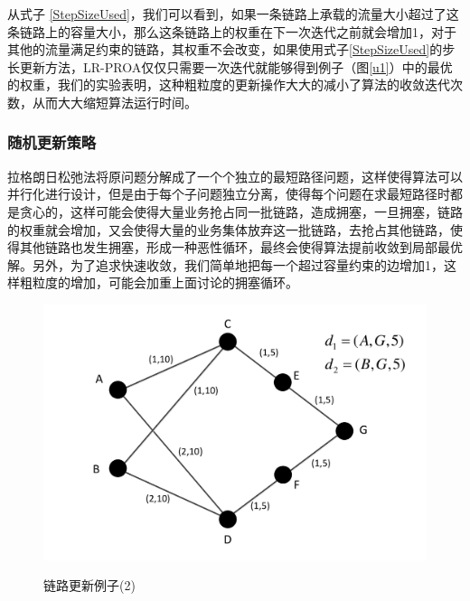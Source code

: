 从式子 \ref{StepSizeUsed}，我们可以看到，如果一条链路上承载的流量大小超过了这条链路上的容量大小，那么这条链路上的权重在下一次迭代之前就会增加1，对于其他的流量满足约束的链路，其权重不会改变，如果使用式子\ref{StepSizeUsed}的步长更新方法，LR-PROA仅仅只需要一次迭代就能够得到例子（图\ref{u1}）中的最优的权重，我们的实验表明，这种粗粒度的更新操作大大的减小了算法的收敛迭代次数，从而大大缩短算法运行时间。
\subsubsection{随机更新策略}

拉格朗日松弛法将原问题分解成了一个个独立的最短路径问题，这样使得算法可以并行化进行设计，但是由于每个子问题独立分离，使得每个问题在求最短路径时都是贪心的，这样可能会使得大量业务抢占同一批链路，造成拥塞，一旦拥塞，链路的权重就会增加，又会使得大量的业务集体放弃这一批链路，去抢占其他链路，使得其他链路也发生拥塞，形成一种恶性循环，最终会使得算法提前收敛到局部最优解。另外，为了追求快速收敛，我们简单地把每一个超过容量约束的边增加1，这样粗粒度的增加，可能会加重上面讨论的拥塞循环。
\begin{figure}
\setlength{\abovecaptionskip}{-0.5cm}
\begin{center}
{\includegraphics[width=0.4 \textwidth]{figures/random.pdf}}
\end{center}
\caption{{\footnotesize{链路更新例子(2)}}}
\label{u2}
\end{figure}

